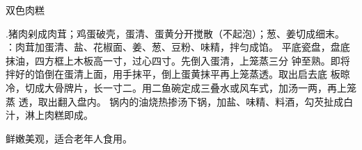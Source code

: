 \begin{recipe}[金银肉糕]{双色肉糕}

\ingredients


\preparation

\step .猪肉剁成肉茸；鸡蛋破壳，蛋清、蛋黄分开搅散（不起泡）；葱、姜切成细末。
\step ：肉茸加蛋清、盐、花椒面、姜、葱、豆粉、味精，拌匀成馅。
\step 平底瓷盘，盘底抹油，四方框上木板高一寸，过心四寸。先倒入蛋清，上笼蒸三分
钟至熟。即将拌好的馅倒在蛋清上面，用手抹平，倒上蛋黄抹平再上笼蒸透。取出启去底
板晾冷，切成大骨牌片，长一寸二。用二鱼碗定成三叠水或风车式，加汤一两，再上笼蒸
透，取出翻入盘内。
\step 锅内的油烧热掺汤下锅，加盐、味精、料酒，勾芡扯成白汁，淋上肉糕即成。

\features

鲜嫩美观，适合老年人食用。

\end{recipe}

